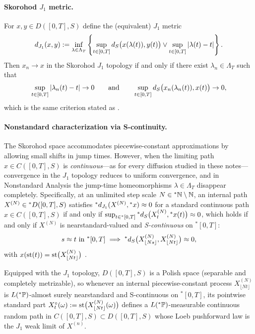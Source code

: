 \paragraph{Skorohod $J_1$ metric.}
For $x, y \in D([0, T], S)$ define the (equivalent) $J_1$ metric
\begin{equation}
\label{eq:appa-j1-metric}
d_{J_1}(x, y) := \inf_{\lambda \in \Lambda_T}\left\{
  \sup_{t \in [0, T]} d_S\bigl(x(\lambda(t)), y(t)\bigr) \vee \sup_{t \in [0, T]} \left\lvert \lambda(t) - t \right\rvert
\right\}.
\end{equation}
Then $x_n \to x$ in the Skorohod $J_1$ topology if and only if there exist $\lambda_n \in \Lambda_T$ such that
\begin{equation}
\label{eq:appa-j1-criterion}
\sup_{t \in [0, T]} \left\lvert \lambda_n(t) - t \right\rvert \to 0
\qquad \text{and} \qquad
\sup_{t \in [0, T]} d_S\bigl(x_n(\lambda_n(t)), x(t)\bigr) \to 0,
\end{equation}
which is the same criterion stated as \cite[(A.1)]{li2022neural}.

\paragraph{Nonstandard characterization via S-continuity.}
The Skorohod space accommodates piecewise-constant approximations by allowing small shifts in jump times. However, when the limiting path $x \in C([0, T], S)$ is \emph{continuous}---as for every diffusion studied in these notes---convergence in the $J_1$ topology reduces to uniform convergence, and in Nonstandard Analysis the jump-time homeomorphisms $\lambda \in \Lambda_T$ disappear completely. Specifically, at an unlimited step scale $N \in {}^*\mathbb{N} \setminus \mathbb{N}$, an internal path $X^{(N)} \in {}^*D([0, T], S)$ satisfies ${}^*d_{J_1}(X^{(N)}, {}^*x) \approx 0$ for a standard continuous path $x \in C([0, T], S)$ if and only if $\sup_{t \in {}^*[0, T]} {}^*d_S\bigl(X_t^{(N)}, {}^*x(t)\bigr) \approx 0$, which holds if and only if $X^{(N)}$ is nearstandard-valued and \emph{S-continuous} on ${}^*[0, T]$:
\[
s \approx t \text{ in } {}^*[0, T] \implies {}^*d_S\bigl(X_{\lfloor Ns \rfloor}^{(N)}, X_{\lfloor Nt \rfloor}^{(N)}\bigr) \approx 0,
\]
with $x(\operatorname{st}(t)) = \operatorname{st}\bigl(X_{\lfloor Nt \rfloor}^{(N)}\bigr)$ \cite{anderson1976nonstandard,keisler1984infinitesimal,lindstrom1988invitation}.

Equipped with the $J_1$ topology, $D([0, T], S)$ is a Polish space (separable and completely metrizable), so whenever an internal piecewise-constant process $X_{\lfloor Nt \rfloor}^{(N)}$ is $L({}^*\mathbb{P})$-almost surely nearstandard and S-continuous on ${}^*[0, T]$, its pointwise standard part $X_t^\circ(\omega) := \operatorname{st}\bigl(X_{\lfloor Nt \rfloor}^{(N)}(\omega)\bigr)$ defines a $L({}^*\mathbb{P})$-measurable continuous random path in $C([0, T], S) \subset D([0, T], S)$ whose Loeb pushforward law is the $J_1$ weak limit of $X^{(n)}$.

